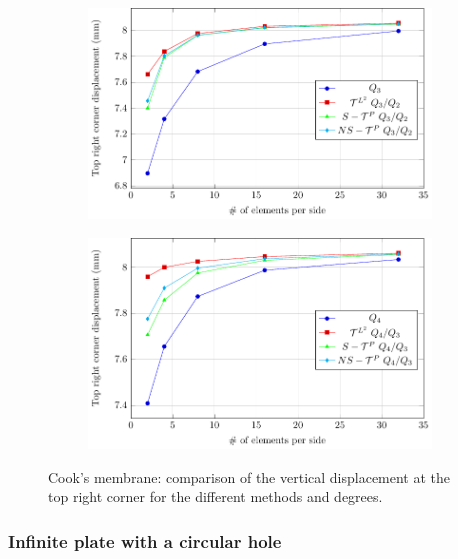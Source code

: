\documentclass{article}
\begin{document}
\begin{figure}[htb!]\ContinuedFloat
    \centering
    \begin{subfigure}[b]{\textwidth}
        \includegraphics[width=.8\linewidth]{Cook's_membrane_Q3}
    \end{subfigure}
    \centering
     \begin{subfigure}[b]{\textwidth}
        \includegraphics[width=.8\linewidth]{Cook's_membrane_Q4}
    \end{subfigure}
	\caption{Cook's membrane: comparison of the vertical displacement at the top right corner for the different methods and degrees.}
	\label{fig:Cook's_result}
\end{figure}

\clearpage

\subsubsection{Infinite plate with a circular hole}
\end{document}
